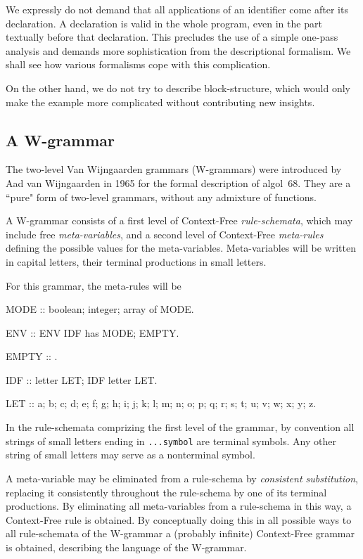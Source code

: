 We expressly do not demand that all applications of an identifier come after
its declaration. A declaration is valid in the whole program, even in
the part textually before that declaration. This precludes the use of a
simple one-pass analysis and demands more sophistication from the
descriptional formalism. We shall see how various formalisms cope with this
complication.

On the other hand, we do not try to describe block-structure, which would
only make the example more complicated without contributing new insights.
\subsection{A W-grammar}
The two-level Van Wijngaarden grammars (W-grammars) were introduced by  
Aad van Wijngaarden in 1965 \cite{wijngaarden:ortho} for the formal
description of {\sc algol~68}. They are a ``pure" form of
two-level grammars, without any admixture of functions.

A W-grammar consists of a first level of Context-Free
{\em rule-schemata}, which may include free
{\em meta-variables}, and a second level of Context-Free
{\em meta-rules} defining the possible values for the meta-variables.
Meta-variables will be written in
capital letters, their terminal productions in small letters.

For this grammar, the meta-rules will be
\begin{elan}
MODE :: boolean; integer; array of MODE.
\end{elan}
\begin{elan}
ENV :: ENV IDF has MODE; EMPTY.
\end{elan}
\begin{elan}
EMPTY :: .
\end{elan}
\begin{elan}
IDF :: letter LET; IDF letter LET.
\end{elan}
\begin{elan}
LET :: a; b; c; d; e; f; g; h; i; j; k; l; m; n; o; p; q;
          r; s; t; u; v; w; x; y; z.
\end{elan}
In the rule-schemata comprizing the first level of the grammar,
by convention all strings of small letters ending in
{\tt ...symbol} are terminal symbols. Any other string of small letters
may serve as a nonterminal symbol. 

A meta-variable may be eliminated from a rule-schema 
by {\em consistent substitution}, replacing it
consistently throughout the rule-schema by
one of its terminal productions.
By eliminating all meta-variables from a rule-schema in this way,
a Context-Free rule is obtained.
By conceptually doing this in all possible ways to all rule-schemata of the
W-grammar a (probably infinite) Context-Free grammar is obtained, describing
the language of the W-grammar.

